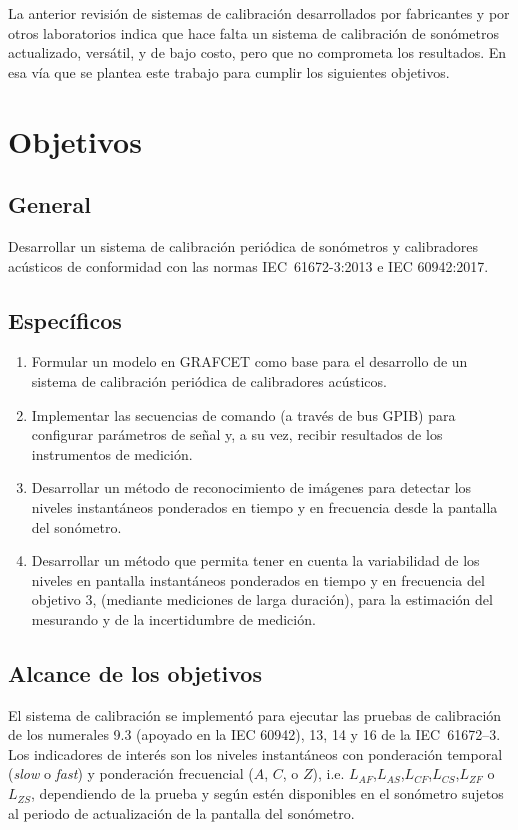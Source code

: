 La anterior revisión de sistemas de calibración desarrollados por fabricantes y por otros laboratorios indica que hace
falta un sistema de calibración de sonómetros actualizado, versátil, y de bajo costo, pero que no comprometa los
resultados.
En esa vía que se plantea este trabajo para cumplir los siguientes objetivos.


\section{Objetivos}

\subsection*{General}

Desarrollar un sistema de calibración periódica de sonómetros y calibradores acústicos de conformidad con las normas
\mbox{IEC 61672-3:2013} e {IEC 60942:2017}.
\vfill
\pagebreak

\subsection*{Específicos}

\begin{enumerate}
    \item Formular un modelo en GRAFCET como base para el desarrollo de un sistema de calibración periódica de
    calibradores acústicos.
    \item Implementar las secuencias de comando (a través de bus GPIB) para configurar parámetros de señal y, a su vez,
    recibir resultados de los instrumentos de medición.
    \item Desarrollar un método de reconocimiento de imágenes para detectar los niveles instantáneos ponderados en
    tiempo y en frecuencia desde la pantalla del sonómetro.
    \item Desarrollar un método que permita tener en cuenta la variabilidad de los niveles en pantalla instantáneos
    ponderados en tiempo y en frecuencia del objetivo 3, (mediante mediciones de larga duración), para la estimación
    del mesurando y de la incertidumbre de medición.
\end{enumerate}

\subsection*{Alcance de los objetivos}
El sistema de calibración se implementó para ejecutar las pruebas de calibración de los numerales 9.3 (apoyado en la
IEC 60942), 13, 14 y 16 de la \mbox{IEC 61672--3}.
Los indicadores de interés son los niveles instantáneos con ponderación temporal (\emph{slow} o \emph{fast}) y
ponderación frecuencial ($A$, $C$, o $Z$), i.e. $L_{AF}$,$L_{AS}$,$L_{CF}$,$L_{CS}$,$L_{ZF}$ o $L_{ZS}$, dependiendo
de la prueba y según estén disponibles en el sonómetro sujetos al periodo de actualización de la pantalla del sonómetro.


